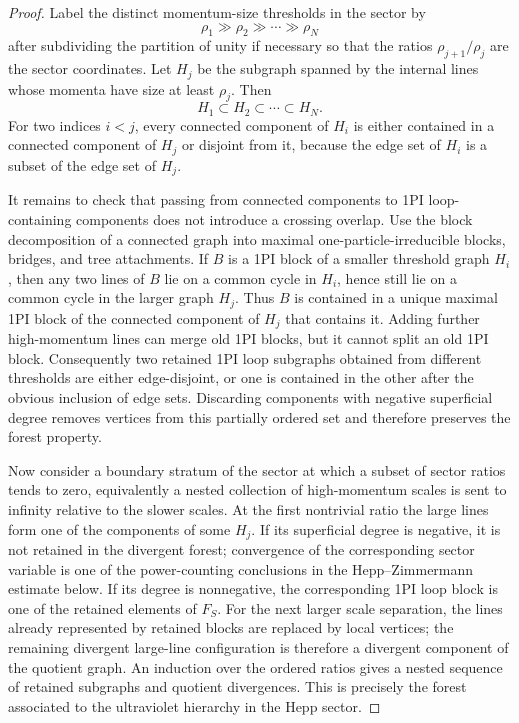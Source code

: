 \begin{proof}
Label the distinct momentum-size thresholds in the sector by
\[
  \rho_1\gg \rho_2\gg\cdots\gg \rho_N
\]
after subdividing the partition of unity if necessary so that the ratios
\(\rho_{j+1}/\rho_j\) are the sector coordinates.  Let \(H_j\) be the
subgraph spanned by the internal lines whose momenta have size at least
\(\rho_j\).  Then
\[
  H_1\subset H_2\subset\cdots\subset H_N .
\]
For two indices \(i<j\), every connected component of \(H_i\) is either
contained in a connected component of \(H_j\) or disjoint from it, because
the edge set of \(H_i\) is a subset of the edge set of \(H_j\).

It remains to check that passing from connected components to 1PI
loop-containing components does not introduce a crossing overlap.  Use the
block decomposition of a connected graph into maximal one-particle-irreducible
blocks, bridges, and tree attachments.  If \(B\) is a 1PI block of a smaller
threshold graph \(H_i\), then any two lines of \(B\) lie on a common cycle in
\(H_i\), hence still lie on a common cycle in the larger graph \(H_j\).
Thus \(B\) is contained in a unique maximal 1PI block of the connected
component of \(H_j\) that contains it.  Adding further high-momentum lines can
merge old 1PI blocks, but it cannot split an old 1PI block.  Consequently two
retained 1PI loop subgraphs obtained from different thresholds are either
edge-disjoint, or one is contained in the other after the obvious inclusion
of edge sets.  Discarding components with negative superficial degree removes
vertices from this partially ordered set and therefore preserves the forest
property.

Now consider a boundary stratum of the sector at which a subset of sector
ratios tends to zero, equivalently a nested collection of high-momentum
scales is sent to infinity relative to the slower scales.  At the first
nontrivial ratio the large lines form one of the components of some
\(H_j\).  If its superficial degree is negative, it is not retained in the
divergent forest; convergence of the corresponding sector variable is one of
the power-counting conclusions in the Hepp--Zimmermann estimate below.  If its
degree is nonnegative, the corresponding 1PI loop block is one of the retained
elements of \(F_S\).  For the next larger scale separation, the lines already
represented by retained blocks are replaced by local vertices; the remaining
divergent large-line configuration is therefore a divergent component of the
quotient graph.  An induction over the ordered ratios gives a nested sequence
of retained subgraphs and quotient divergences.  This is precisely the forest
associated to the ultraviolet hierarchy in the Hepp sector.
\end{proof}

